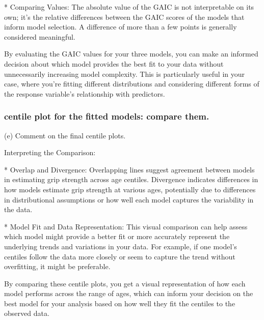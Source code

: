 *    Comparing Values: The absolute value of the GAIC is not interpretable on its own; it's the relative differences between the GAIC scores of the models that inform model selection. A difference of more than a few points is generally considered meaningful.

By evaluating the GAIC values for your three models, you can make an informed decision about which model provides the best fit to your data without unnecessarily increasing model complexity. This is particularly useful in your case, where you're fitting different distributions and considering different forms of the response variable's relationship with predictors.




\subsubsection{centile plot for the fitted models: compare them.}

(e) Comment on the final centile plots.


Interpreting the Comparison:

*    Overlap and Divergence: Overlapping lines suggest agreement between models in estimating grip strength across age centiles. Divergence indicates differences in how models estimate grip strength at various ages, potentially due to differences in distributional assumptions or how well each model captures the variability in the data.

*    Model Fit and Data Representation: This visual comparison can help assess which model might provide a better fit or more accurately represent the underlying trends and variations in your data. For example, if one model's centiles follow the data more closely or seem to capture the trend without overfitting, it might be preferable.

By comparing these centile plots, you get a visual representation of how each model performs across the range of ages, which can inform your decision on the best model for your analysis based on how well they fit the centiles to the observed data.

